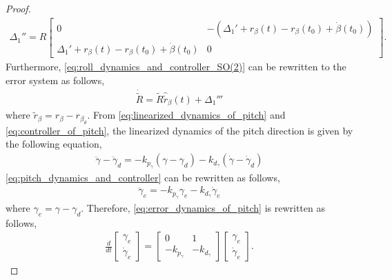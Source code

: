 \begin{proof}
{\begin{align}
        \label{eq:definition_of_Delta1''}
        \Delta_1'' = R
        \begin{bmatrix}
            0 & -(\Delta_1' + r_{\beta}(t) - r_{\beta}(t_0) + \dot{\beta} (t_0))\\
            \Delta_1' + r_{\beta}(t) - r_{\beta}(t_0) + \dot{\beta} (t_0) & 0
        \end{bmatrix}.
    \end{align}
    Furthermore, \eqref{eq:roll_dynamics_and_controller_SO(2)} can be rewritten to the error system as follows,
    \begin{align}
        \label{eq:roll_dynamics_and_controller_SO(2)_error}
        \dot{\tilde{R}} = \tilde{R} \hat{\tilde{r}}_{\beta}(t) + \Delta_1'''
    \end{align}
    where $ \tilde{r}_{\beta} = r_{\beta} - r_{\beta_d} $.
    }
    From \eqref{eq:linearized_dynamics_of_pitch} and \eqref{eq:controller_of_pitch}, the linearized dynamics of the pitch direction is given by the following equation,
    \begin{align}
        \label{eq:pitch_dynamics_and_controller}
        \ddot{\gamma} - \ddot{\gamma}_d= - k_{p_{\gamma}} (\gamma - \gamma_d) - k_{d_{\gamma}} (\dot{\gamma} - \dot{\gamma}_d)
    \end{align}
    \eqref{eq:pitch_dynamics_and_controller} can be rewritten as follows,
    \begin{align}
        \label{eq:error_dynamics_of_pitch}
        \ddot{\gamma}_e = - k_{p_{\gamma}} \gamma_e - k_{d_{\gamma}} \dot{\gamma}_e
    \end{align}
    where $ \gamma_e = \gamma - \gamma_d $.
    Therefore, \eqref{eq:error_dynamics_of_pitch} is rewritten as follows,
    \begin{align}
        \label{eq:error_dynamics_of_pitch_matrix}
        \frac{d}{dt}
        \begin{bmatrix}
            \gamma_e \\
            \dot{\gamma}_e
        \end{bmatrix}
        =
        \begin{bmatrix}
            0 & 1 \\
            - k_{p_{\gamma}} & -k_{d_{\gamma}}
        \end{bmatrix}
        \begin{bmatrix}
            \gamma_e \\
            \dot{\gamma}_e
        \end{bmatrix}.
    \end{align}


\end{proof}
